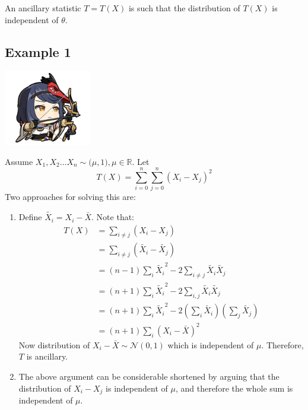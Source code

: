 \documentclass[oneside]{book}
\begin{document}
An ancillary statistic $T=T(X)$ is such that the distribution of $T(X)$ is independent of $\theta$. 
\subsection{Example 1}\begin{marginfigure}%
    \includegraphics[width=1.5in]{chibis/file_009.png}
\end{marginfigure}%
Assume $X_1,X_2\hdots X_n\sim\mathcal(\mu,1),\mu\in\mathbb R$. Let
$$T(X)=\sum_{i=0}^n\sum_{j=0}^n(X_i-X_j)^2$$ 
Two approaches for solving this are:
\begin{enumerate}
    \item Define $\tilde{X_i}=X_i-\bar X$. Note that:
        \begin{align*}
            T(X)&=\sum_{i\ne j}(X_i-X_j)\\
            &=\sum_{i\ne j}(\tilde{X_i}-\tilde{X_j})\\
            &=(n-1)\sum_{i}\tilde{X_i}^2-2\sum_{i\ne j}\tilde{X_i}\tilde{X_j}\\
            &=(n+1)\sum_{i}\tilde{X_i}^2-2\sum_{i,j}\tilde{X_i}\tilde{X_j}\\
            &=(n+1)\sum_{i}\tilde{X_i}^2-2\left(\sum_{i}\tilde{X_i}\right)\left(\sum_{j}\tilde{X_j}\right)\\
            &=(n+1)\sum_{i}\left(X_i-\bar X\right)^2
        \end{align*}
        Now distribution of $X_i-\bar X\sim\mathcal N(0,1)$ which is independent of $\mu$. Therefore, $T$ is ancillary.
    \item The above argument can be considerable shortened by arguing that the distribution of $X_i-X_j$ is independent of $\mu$, and therefore the whole sum is independent of $\mu$.
\end{enumerate}
\end{document}
